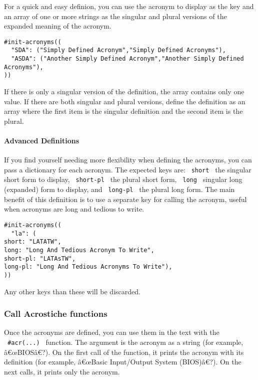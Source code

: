 For a quick and easy definion, you can use the acronym to display as the
key and an array of one or more strings as the singular and plural
versions of the expanded meaning of the acronym.

\begin{verbatim}
#init-acronyms((
  "SDA": ("Simply Defined Acronym","Simply Defined Acronyms"),
  "ASDA": ("Another Simply Defined Acronym","Another Simply Defined Acronyms"),
))
\end{verbatim}

If there is only a singular version of the definition, the array
contains only one value. If there are both singular and plural versions,
define the definition as an array where the first item is the singular
definition and the second item is the plural.

\paragraph{Advanced Definitions}\label{advanced-definitions}

If you find yourself needing more flexibility when defining the
acronyms, you can pass a dictionary for each acronym. The expected keys
are: \texttt{\ short\ } the singular short form to display,
\texttt{\ short-pl\ } the plural short form, \texttt{\ long\ } singular
long (expanded) form to display, and \texttt{\ long-pl\ } the plural
long form. The main benefit of this definition is to use a separate key
for calling the acronym, useful when acronyms are long and tedious to
write.

\begin{verbatim}
#init-acronyms((
  "la": (
short: "LATATW",
long: "Long And Tedious Acronym To Write",
short-pl: "LATAsTW",
long-pl: "Long And Tedious Acronyms To Write"),
))
\end{verbatim}

Any other keys than these will be discarded.

\subsubsection{Call Acrostiche
functions}\label{call-acrostiche-functions}

Once the acronyms are defined, you can use them in the text with the
\texttt{\ \#acr(...)\ } function. The argument is the acronym as a
string (for example, â€œBIOSâ€?). On the first call of the function, it
prints the acronym with its definition (for example, â€œBasic
Input/Output System (BIOS)â€?). On the next calls, it prints only the
acronym.

